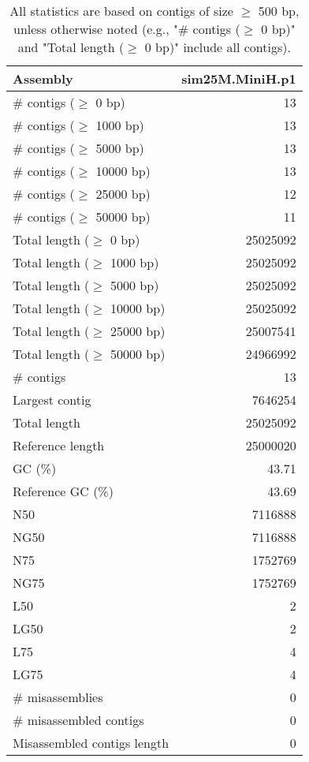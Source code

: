 \documentclass[12pt,a4paper]{article}
\begin{document}
\begin{table}[ht]
\begin{center}
\caption{All statistics are based on contigs of size $\geq$ 500 bp, unless otherwise noted (e.g., "\# contigs ($\geq$ 0 bp)" and "Total length ($\geq$ 0 bp)" include all contigs).}
\begin{tabular}{|l*{1}{|r}|}
\hline
Assembly & sim25M.MiniH.p1 \\ \hline
\# contigs ($\geq$ 0 bp) & 13 \\ \hline
\# contigs ($\geq$ 1000 bp) & 13 \\ \hline
\# contigs ($\geq$ 5000 bp) & 13 \\ \hline
\# contigs ($\geq$ 10000 bp) & 13 \\ \hline
\# contigs ($\geq$ 25000 bp) & 12 \\ \hline
\# contigs ($\geq$ 50000 bp) & 11 \\ \hline
Total length ($\geq$ 0 bp) & 25025092 \\ \hline
Total length ($\geq$ 1000 bp) & 25025092 \\ \hline
Total length ($\geq$ 5000 bp) & 25025092 \\ \hline
Total length ($\geq$ 10000 bp) & 25025092 \\ \hline
Total length ($\geq$ 25000 bp) & 25007541 \\ \hline
Total length ($\geq$ 50000 bp) & 24966992 \\ \hline
\# contigs & 13 \\ \hline
Largest contig & 7646254 \\ \hline
Total length & 25025092 \\ \hline
Reference length & 25000020 \\ \hline
GC (\%) & 43.71 \\ \hline
Reference GC (\%) & 43.69 \\ \hline
N50 & 7116888 \\ \hline
NG50 & 7116888 \\ \hline
N75 & 1752769 \\ \hline
NG75 & 1752769 \\ \hline
L50 & 2 \\ \hline
LG50 & 2 \\ \hline
L75 & 4 \\ \hline
LG75 & 4 \\ \hline
\# misassemblies & 0 \\ \hline
\# misassembled contigs & 0 \\ \hline
Misassembled contigs length & 0 \\ \hline

\end{tabular}
\end{center}
\end{table}
\end{document}
